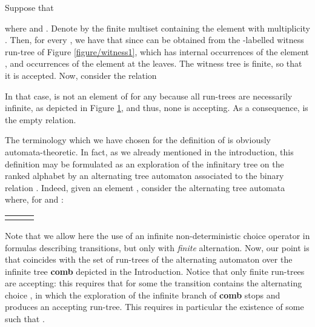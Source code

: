 \documentclass[runningheads,a4paper]{llncs}
\begin{document}
\begin{example}
\label{example/witness}
Suppose that 

where  and . Denote by  the finite multiset containing the element  with multiplicity . 
Then, for every , we have that  
since  can be obtained from the -labelled witness run-tree 
of Figure \ref{figure/witness1}, which has  internal occurrences of the element , 
and  occurrences of the element  at the leaves. The witness tree is finite, so that it is accepted.
Now, consider the relation

In that case,  is not an element of  for any 
because all run-trees are necessarily infinite, as depicted in Figure \ref{figure/badwitness}, 
and thus, none is accepting. 
As a consequence,  is the empty relation.

\begin{figure}[t]
\begin{small}
\centering
\begin{minipage}{.5\textwidth}
  \centering
{}
\label{figure/witness1}
\end{minipage}\begin{minipage}{.5\textwidth}
  \centering
\label{figure/badwitness}
\end{minipage}
\end{small}
\vspace{-0.5cm}
\end{figure}
\end{example}
The terminology which we have chosen for the definition of  is obviously automata-theoretic.
In fact, as we already mentioned in the introduction, this definition may be formulated
as an exploration of the infinitary tree  on the ranked alphabet 
by an alternating tree automaton associated to the binary relation .
Indeed, given an element , 
consider the alternating tree automata  where, for  and :

\begin{center}
\begin{tabular}{rcl}
 &
 &
\\
\end{tabular}
\end{center}
Note that we allow here the use of an infinite non-deterministic choice operator  in formulas describing transitions, but only with \emph{finite} alternation.
Now, our point is that  coincides with the set of run-trees of the alternating automaton 
over the infinite tree \textbf{comb} depicted in the Introduction. 
Notice that only finite run-trees are accepting: this requires that for some  the transition  contains the alternating choice , in which the exploration of the infinite branch of \textbf{comb} stops and produces an accepting run-tree. This requires in particular the existence of some  such that .
\end{document}
